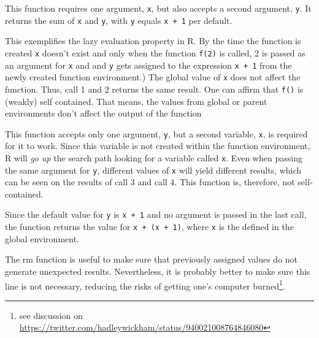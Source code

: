 \documentclass[12,]{article}
\providecommand{\tightlist}{%
  \setlength{\itemsep}{0pt}\setlength{\parskip}{0pt}}
\let\rmarkdownfootnote\footnote%
\def\footnote{\protect\rmarkdownfootnote}
\begin{document}
\begin{description}
\tightlist
\item[Call 1 and 2]
This function requires one argument, \texttt{x}, but also accepts a
second argument, \texttt{y}. It returns the sum of \texttt{x} and
\texttt{y}, with \texttt{y} equals \texttt{x\ +\ 1} per default.

This exemplifies the lazy evaluation property in R. By the time the
function is created \texttt{x} doesn't exist and only when the function
\texttt{f(2)} is called, 2 is passed as an argument for \texttt{x} and
and \texttt{y} gets assigned to the expression \texttt{x\ +\ 1} from the
newly created function environment.) The global value of \texttt{x} does
not affect the function. Thus, call 1 and 2 returns the same result. One
can affirm that \texttt{f()} is (weakly) self contained. That means, the
values from global or parent environments don't affect the output of the
function
\item[Call 3 and 4]
This function accepts only one argument, \texttt{y}, but a second
variable, \texttt{x}, is required for it to work. Since this variable is
not created within the function environment, R will \emph{go up} the
search path looking for a variable called \texttt{x}. Even when passing
the same argument for \texttt{y}, different values of \texttt{x} will
yield different results, which can be seen on the results of call 3 and
call 4. This function is, therefore, not self-contained.
\item[Call 5]
Since the default value for \texttt{y} is \texttt{x\ +\ 1} and no
argument is passed in the last call, the function returns the value for
\texttt{x\ +\ (x\ +\ 1)}, where \texttt{x} is the defined in the global
environment.
\item[rm function]
The rm function is useful to make sure that previously assigned values
do not generate unexpected results. Nevertheless, it is probably better
to make sure this line is not necessary, reducing the risks of getting
one's computer burned\footnote{see discussion on
  \url{https://twitter.com/hadleywickham/status/940021008764846080}}.
\end{description}
\end{document}
